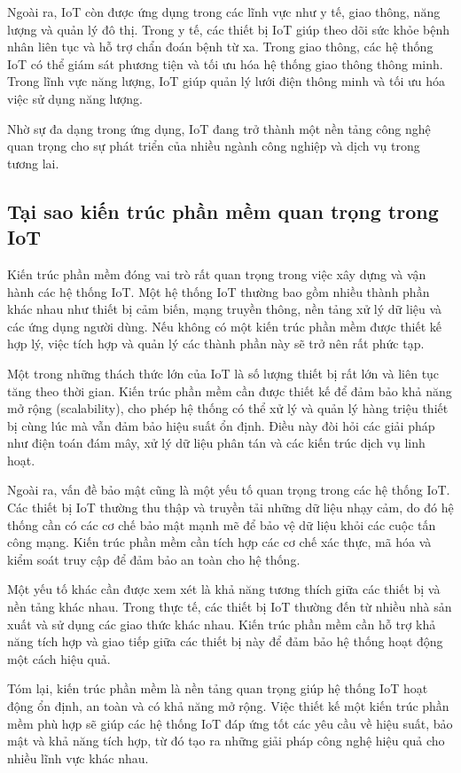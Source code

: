 Ngoài ra, IoT còn được ứng dụng trong các lĩnh vực như y tế, giao thông, năng lượng và quản lý đô thị. Trong y tế, các thiết bị IoT giúp theo dõi sức khỏe bệnh nhân liên tục và hỗ trợ chẩn đoán bệnh từ xa. Trong giao thông, các hệ thống IoT có thể giám sát phương tiện và tối ưu hóa hệ thống giao thông thông minh. Trong lĩnh vực năng lượng, IoT giúp quản lý lưới điện thông minh và tối ưu hóa việc sử dụng năng lượng.

Nhờ sự đa dạng trong ứng dụng, IoT đang trở thành một nền tảng công nghệ quan trọng cho sự phát triển của nhiều ngành công nghiệp và dịch vụ trong tương lai.
\subsection{Tại sao kiến trúc phần mềm quan trọng trong IoT}
Kiến trúc phần mềm đóng vai trò rất quan trọng trong việc xây dựng và vận hành các hệ thống IoT. Một hệ thống IoT thường bao gồm nhiều thành phần khác nhau như thiết bị cảm biến, mạng truyền thông, nền tảng xử lý dữ liệu và các ứng dụng người dùng. Nếu không có một kiến trúc phần mềm được thiết kế hợp lý, việc tích hợp và quản lý các thành phần này sẽ trở nên rất phức tạp.

Một trong những thách thức lớn của IoT là số lượng thiết bị rất lớn và liên tục tăng theo thời gian. Kiến trúc phần mềm cần được thiết kế để đảm bảo khả năng mở rộng (scalability), cho phép hệ thống có thể xử lý và quản lý hàng triệu thiết bị cùng lúc mà vẫn đảm bảo hiệu suất ổn định. Điều này đòi hỏi các giải pháp như điện toán đám mây, xử lý dữ liệu phân tán và các kiến trúc dịch vụ linh hoạt.

Ngoài ra, vấn đề bảo mật cũng là một yếu tố quan trọng trong các hệ thống IoT. Các thiết bị IoT thường thu thập và truyền tải những dữ liệu nhạy cảm, do đó hệ thống cần có các cơ chế bảo mật mạnh mẽ để bảo vệ dữ liệu khỏi các cuộc tấn công mạng. Kiến trúc phần mềm cần tích hợp các cơ chế xác thực, mã hóa và kiểm soát truy cập để đảm bảo an toàn cho hệ thống.

Một yếu tố khác cần được xem xét là khả năng tương thích giữa các thiết bị và nền tảng khác nhau. Trong thực tế, các thiết bị IoT thường đến từ nhiều nhà sản xuất và sử dụng các giao thức khác nhau. Kiến trúc phần mềm cần hỗ trợ khả năng tích hợp và giao tiếp giữa các thiết bị này để đảm bảo hệ thống hoạt động một cách hiệu quả.

Tóm lại, kiến trúc phần mềm là nền tảng quan trọng giúp hệ thống IoT hoạt động ổn định, an toàn và có khả năng mở rộng. Việc thiết kế một kiến trúc phần mềm phù hợp sẽ giúp các hệ thống IoT đáp ứng tốt các yêu cầu về hiệu suất, bảo mật và khả năng tích hợp, từ đó tạo ra những giải pháp công nghệ hiệu quả cho nhiều lĩnh vực khác nhau.